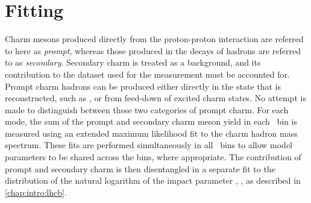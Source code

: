 \chapter{Fitting}
\label{chap:prod:fitting}

Charm mesons produced directly from the proton-proton interaction are referred 
to here as \emph{prompt}, whereas those produced in the decays of \PB hadrons 
are referred to as \emph{secondary}.
Secondary charm is treated as a background, and its contribution to the dataset 
used for the measurement must be accounted for.
Prompt charm hadrons can be produced either directly in the state that is 
reconstructed, such as \PDzero, or from feed-down of excited charm states.
No attempt is made to distinguish between these two categories of prompt charm.
For each mode, the sum of the prompt and secondary charm meson yield in each 
\pTy\ bin is measured using an extended maximum likelihood fit to the charm 
hadron mass spectrum.
These fits are performed simultaneously in all \pTy\ bins to allow model 
parameters to be shared across the bins, where appropriate.
The contribution of prompt and secondary charm is then disentangled in a 
separate fit to the distribution of the natural logarithm of the impact 
parameter \chisq, \lnipchisq, as described in \cref{chap:intro:lhcb}.
